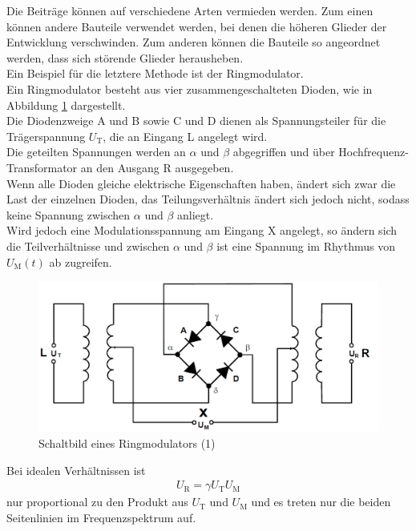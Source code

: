 \documentclass[]{scrartcl}
\begin{document}
Die Beiträge können auf verschiedene Arten vermieden werden. Zum einen können andere Bauteile verwendet werden, bei denen die höheren Glieder der Entwicklung verschwinden. Zum anderen können die Bauteile so angeordnet werden, dass sich störende Glieder herausheben.\\
Ein Beispiel für die letztere Methode ist der Ringmodulator.\\
Ein Ringmodulator besteht aus vier zusammengeschalteten Dioden, wie in Abbildung \ref{fig:ringmodulator} dargestellt.\\
Die Diodenzweige A und B sowie C und D dienen als Spannungsteiler für die Trägerspannung $U_{\text{T}}$, die an Eingang L angelegt wird.\\
Die geteilten Spannungen werden an $\alpha$ und $\beta$ abgegriffen und über Hochfrequenz-Transformator an den Ausgang R ausgegeben.\\
Wenn alle Dioden gleiche elektrische Eigenschaften haben, ändert sich zwar die Last der einzelnen Dioden, das Teilungsverhältnis ändert sich jedoch nicht, sodass keine Spannung zwischen $\alpha$ und $\beta$ anliegt.\\
Wird jedoch eine Modulationsspannung am Eingang X angelegt, so ändern sich die Teilverhältnisse und zwischen $\alpha$ und $\beta$ ist eine Spannung im Rhythmus von $U_{\text{M}}\left(t\right)$ ab zugreifen.\\
\begin{figure}[H]
\centering 
\includegraphics[width=13cm]{images/ringmodulatorschaltung.png}
\caption{Schaltbild eines Ringmodulators (1)}
\label{fig:ringmodulator}
\end{figure} 
Bei idealen Verhältnissen ist
\begin{align}
U_{\text{R}}=\gamma U_{\text{T}}U_{\text{M}}
\end{align}
nur proportional zu den Produkt aus $U_{\text{T}}$ und $U_{\text{M}}$ und es treten nur die beiden Seitenlinien im Frequenzspektrum auf.
\end{document}
